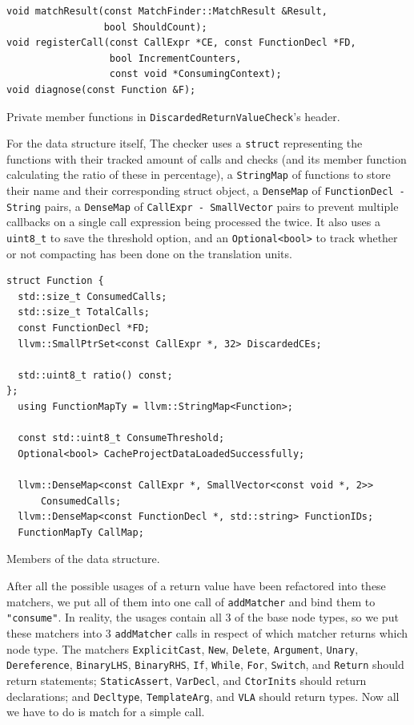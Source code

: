 \begin{listing}[H]
  \begin{verbatim}
void matchResult(const MatchFinder::MatchResult &Result,
                 bool ShouldCount);
void registerCall(const CallExpr *CE, const FunctionDecl *FD,
                  bool IncrementCounters,
                  const void *ConsumingContext);
void diagnose(const Function &F);
  \end{verbatim}
  \caption{Private member functions in \texttt{DiscardedReturnValueCheck}'s header.}\label{lst:drv-member}
\end{listing}

For the data structure itself, The checker uses a \texttt{struct} representing the functions with their tracked amount of calls and
checks (and its member function calculating the ratio of these in percentage), a \texttt{StringMap} of functions to store their
name and their corresponding struct object, a \texttt{DenseMap} of \texttt{FunctionDecl - String} pairs, a
\texttt{DenseMap} of \texttt{CallExpr - SmallVector} pairs to prevent multiple callbacks on a single call expression
being processed the twice. It also uses a \texttt{uint8_t} to save the threshold option, and an \texttt{Optional<bool>} to
track whether or not compacting has been done on the translation units.

\begin{listing}[H]
  \begin{verbatim}
struct Function {
  std::size_t ConsumedCalls;
  std::size_t TotalCalls;
  const FunctionDecl *FD;
  llvm::SmallPtrSet<const CallExpr *, 32> DiscardedCEs;

  std::uint8_t ratio() const;
};
  using FunctionMapTy = llvm::StringMap<Function>;

  const std::uint8_t ConsumeThreshold;
  Optional<bool> CacheProjectDataLoadedSuccessfully;

  llvm::DenseMap<const CallExpr *, SmallVector<const void *, 2>>
      ConsumedCalls;
  llvm::DenseMap<const FunctionDecl *, std::string> FunctionIDs;
  FunctionMapTy CallMap;
  \end{verbatim}
  \caption{Members of the data structure.}\label{lst:remaining-members}
\end{listing}

After all the possible usages of a return value have been
refactored into these matchers, we put all of them into one call of \texttt{addMatcher} and bind them to
\texttt{"consume"}. In reality, the usages contain all 3 of the base node types, so we put these matchers into 3 \texttt{addMatcher} calls
in respect of which matcher returns which node type. The matchers \texttt{ExplicitCast}, \texttt{New}, \texttt{Delete}, \texttt{Argument}, \texttt{Unary}, \texttt{Dereference},
\texttt{BinaryLHS}, \texttt{BinaryRHS}, \texttt{If}, \texttt{While}, \texttt{For}, \texttt{Switch}, and \texttt{Return} should return statements; \texttt{StaticAssert}, \texttt{VarDecl}, and \texttt{CtorInits}
should return declarations; and \texttt{Decltype}, \texttt{TemplateArg}, and \texttt{VLA} should return types.
Now all we have to do is match for a simple call.

